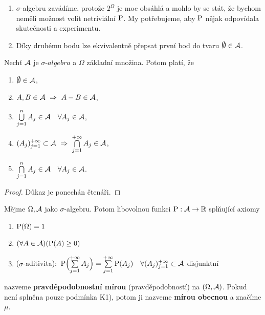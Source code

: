 \begin{remark}
	\begin{enumerate}
		\item 	$\sigma$-algebru zavádíme, protože $2^\Omega$ je moc obsáhlá a mohlo by se stát, že bychom neměli možnost volit netriviální $\mathrm{P}$. My potřebujeme, aby $\mathrm{P}$ nějak odpovídala skutečnosti a experimentu.
		\item Díky druhému bodu lze ekvivalentně přepsat první bod do tvaru $\emptyset\in\Aa$.
	\end{enumerate}

\end{remark}
\begin{theorem}
	Nechť $\mathcal{A} $ je $\sigma\textit{-algebra}$ a $\Omega$ základní množina. Potom platí, že 
	\begin{enumerate}[1)]
	\item $\emptyset \in \Aa $,
	\item $A,B \in \mathcal{A}  ~\Rightarrow~ A-B \in \mathcal{A} $,
	\item $\bigcup\limits_{j=1}^n A_j \in \mathcal{A}  ~~~\forall A_j \in \mathcal{A} $,
	\item $(A_j)_{j=1}^{+\infty} \subset \mathcal{A}  ~\Rightarrow~ \bigcap\limits_{j=1}^{+\infty} A_j \in \mathcal{A} $,
	\item $\bigcap\limits_{j=1}^n A_j \in \mathcal{A} ~~~\forall A_j \in \mathcal{A} $.
\end{enumerate}
	\begin{proof}
		Důkaz je ponechán čtenáři.
	\end{proof} 
\end{theorem}

\newpage
\begin{define}
	Mějme $\Omega, \mathcal{A} $ jako $\sigma$-algebru. Potom libovolnou funkci $\mathrm{P}: \mathcal{A} \to\mathbb{R}$ splňující axiomy
	\begin{enumerate}[K1)]
	\item $\mathrm{P}(\Omega)=1$
	\item $(\forall A \in \mathcal{A} )(\mathrm{P}(A)\geq 0)$
	\item ($\sigma$-aditivita):~$\mathrm{P}\Bigl(\sum\limits_{j=1}^{+\infty} A_j\Bigr) = \sum\limits_{j=1}^{+\infty} \mathrm{P}(A_j)~~~\forall (A_j)_{j=1}^{+\infty} \subset \mathcal{A} $ disjunktní
\end{enumerate}	
nazveme \textbf{pravděpodobnostní mírou} (pravděpodobností) na $(\Omega,\mathcal{A} )$. Pokud není splněna pouze podmínka K1), potom ji nazveme \textbf{mírou obecnou} a značíme $\mu$.

\end{define} 

